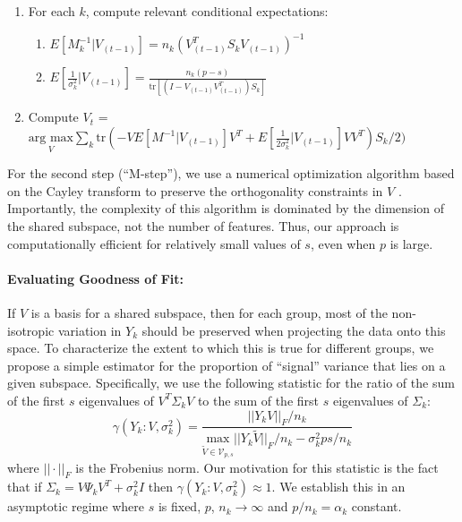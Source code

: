\documentclass[12pt]{article}
\begin{document}
\begin{enumerate}
\item For each $k$, compute relevant conditional expectations:
\begin{enumerate}
\item $E[M_k^{-1} | V_{(t-1)}] = n_k(V_{(t-1)}^T S_kV_{(t-1)})^{-1}$
\item $E[\frac{1}{\sigma_k^2}|V_{(t-1)}] = \frac{n_k(p-s)}{\text{tr}[(I-V_{(t-1)}V_{(t-1)}^T)S_k]}$
\end{enumerate}
\item Compute $V_{t}$ = $\underset{V}{\text{arg } \text{max}}  \sum_k \text{tr}\left(-VE[M^{-1}|V_{(t-1)}]V^T +
       E[\frac{1}{2\sigma_k^2}|V_{(t-1)}]VV^T\right)S_k/2)$ 
\end{enumerate}

For the second step (``M-step''), we use a numerical optimization algorithm based on
the Cayley transform to preserve the orthogonality constraints in $V$
\citep{Wen2013}.  Importantly, the complexity of this algorithm is
dominated by the dimension of the shared subspace, not the number of
features.  Thus, our approach is computationally efficient for
relatively small values of $s$, even when $p$ is large.

\paragraph{Evaluating Goodness of Fit:}

If $V$ is a basis for a shared subspace, then for each group, most
of the non-isotropic variation in $Y_k$ should be preserved when
projecting the data onto this space.  To characterize the extent to
which this is true for different groups, we propose a simple estimator
for the proportion of ``signal'' variance that lies on a given
subspace.  Specifically, we use the following statistic for the ratio
of the sum of the first $s$ eigenvalues of
$V^T \Sigma_k V$ to the sum of the first $s$ eigenvalues
of $\Sigma_k$:
%
\begin{equation}
\gamma(Y_k: V, \sigma_k^2) = \frac{||Y_kV||_F/n_k}{\underset{\widetilde{V} \in \mathcal{V}_{p, s}}{\text{max}}
  ||Y_k\widetilde{V}||_F/n_k - \sigma_k^2ps/n_k}
\label{eqn:ratio}
\end{equation}
%
\noindent where $||\cdot||_F$ is the Frobenius norm. Our motivation for
this statistic is the fact that if
$\Sigma_k = V\Psi_kV^T + \sigma_k^2I$ then
$\gamma(Y_k: V, \sigma_k^2) \approx 1$.  We establish
this in an asymptotic regime where $s$ is fixed, $p$,
$n_k \rightarrow \infty$ and $p/n_k = \alpha_k$ constant.
\end{document}
